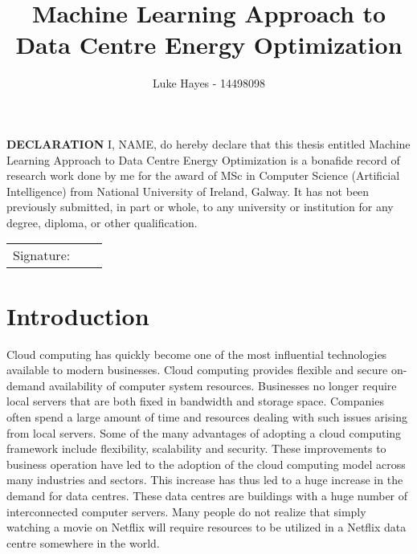 \documentclass[oneside,12pt]{Classes/RoboticsLaTeX}
\title{\Large{Machine Learning Approach to Data Centre Energy Optimization}}
\author{Luke Hayes - 14498098}
\begin{document}
\begin{spacing}{1}
\maketitle
\end{spacing}

\newpage\null\thispagestyle{empty}\newpage

\setcounter{secnumdepth}{3}
\setcounter{tocdepth}{3}

\frontmatter
\textbf{DECLARATION} 
I, NAME, do hereby declare that this thesis entitled Machine Learning Approach to Data Centre Energy Optimization is a bonafide record of research work done by me for the award of MSc in Computer Science (Artificial Intelligence) from National University of Ireland, Galway. It has not been previously submitted, in part or whole, to any university or institution for any degree, diploma, or other qualification. 
\newline

\begin{tabular}{@{}p{.5in}p{4in}@{}}
Signature: & ~~\hrulefill \\
\end{tabular}
\newpage
\mainmatter
\chapter{Introduction}
\label{chap:introduction}
Cloud computing has quickly become one of the most influential technologies available to modern businesses. Cloud computing provides flexible and secure on-demand availability of computer system resources. Businesses no longer require local servers that are both fixed in bandwidth and storage space. Companies often spend a large amount of time and resources dealing with such issues arising from local servers. Some of the many advantages of adopting a cloud computing framework include flexibility, scalability and security. These improvements to business operation have led to the adoption of the cloud computing model across many industries and sectors. This increase has thus led to a huge increase in the demand for data centres. These data centres are buildings with a huge number of interconnected computer servers. Many people do not realize that simply watching a movie on Netflix will require resources to be utilized in a Netflix data centre somewhere in the world. 
\end{document}
